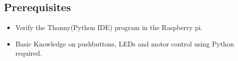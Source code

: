 



\subsection*{\Large Prerequisites}
    \begin{itemize}
        \item Verify the  Thonny(Python IDE) program in the Raspberry pi.\\ 
        \item  Basic Knowledge on pushbuttons, LEDs and motor control using Python required. \\
    \end{itemize}

